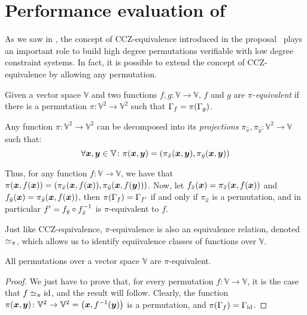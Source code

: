 \section{Performance evaluation of \Arion}\label{sec:performance}
As we saw in , the concept of CCZ-equivalence introduced in the \Anemoi{} 
proposal~\cite{BouvierBCPSVW2022} plays an important role to build high degree permutations 
verifiable with low degree constraint systems.
In fact, it is possible to extend the concept of CCZ-equivalence by allowing any permutation.
\begin{definition}[\(\pi \)-equivalence]
  Given a vector space \(\mathbb{V}\) and two functions \(f,g\colon \mathbb{V} \to \mathbb{V}\), 
  \(f\) and \(g\) are \emph{\(\pi \)-equivalent} if there is a permutation 
  \(\pi\colon \mathbb{V}^2 \to \mathbb{V}^2\) such that \(\Gamma_{f} = \call{\pi}{\Gamma_{g}}\).
\end{definition}

Any function \(\pi\colon \mathbb{V}^2 \to \mathbb{V}^2\) can be decomposed into its 
\emph{projections} \(\pi_{\hat{x}}, \pi_{\hat{y}}\colon \mathbb{V}^2 \to \mathbb{V}\) such that:
\[
  \forall \bm{x}, \bm{y} \in \mathbb{V}\colon \call{\pi}{\bm{x}, \bm{y}} = 
    \Tuple{\call{\pi_{\hat{x}}}{\bm{x}, \bm{y}}, \call{\pi_{\hat{y}}}{\bm{x}, \bm{y}}}
\]

Thus, for any function \(f\colon \mathbb{V} \to \mathbb{V}\), we have that 
\(\call{\pi}{\bm{x}, \call{f}{\bm{x}}} = 
  \Tuple{\call{\pi_{\hat{x}}}{\bm{x}, \call{f}{\bm{x}}}, 
  \call{\pi_{\hat{y}}}{\bm{x}, \call{f}{\bm{y}}}}\).
Now, let \(\call{f_{\hat{x}}}{\bm{x}} = \call{\pi_{\hat{x}}}{\bm{x}, \call{f}{\bm{x}}}\) and 
\(\call{f_{\hat{y}}}{\bm{x}} = \call{\pi_{\hat{y}}}{\bm{x}, \call{f}{\bm{x}}}\), then 
\(\call{\pi}{\Gamma_f} = \Gamma_{f'}\) if and only if \(\pi_{\hat{x}}\) is a permutation, and 
in particular \(f' = f_{\hat{y}} \circ f_{\hat{x}}^{-1}\) is \(\pi \)-equivalent to \(f\).

Just like CCZ-equivalence, \(\pi \)-equivalence is also an equivalence relation, denoted 
\(\simeq_{\pi} \), which allows us to identify equiivalence classes of functions over \(\mathbb{V}\).
\begin{lemma}\label{lem:pi_equiv}
  All permutations over a vector space \(\mathbb{V}\) are \(\pi \)-equivalent.
\end{lemma}
\begin{proof}
  We just have to prove that, for every permutation \(f\colon \mathbb{V} \to \mathbb{V}\), it 
  is the case that \(f \simeq_{\pi} \mathrm{id} \), and the result will follow.
  Clearly, the function \(\call{\pi}{\bm{x}, \bm{y}}\colon \mathbb{V}^2 \to \mathbb{V}^2 = 
    \Tuple{\bm{x}, \call{f^{-1}}{\bm{y}}}\) is a permutation, and 
  \(\call{\pi}{\Gamma_f} = \Gamma_{\fooid}\).
\end{proof}

